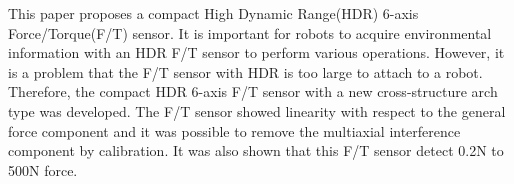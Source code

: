 This paper proposes a compact High Dynamic Range(HDR) 6-axis Force/Torque(F/T) sensor.
It is important for robots to acquire environmental information with an HDR F/T sensor to perform various operations.
However, it is a problem that the F/T sensor with HDR is too large to attach to a robot.
Therefore, the compact HDR 6-axis F/T sensor with a new cross-structure arch type was developed.
The F/T sensor showed linearity with respect to the general force component and it was possible to remove the multiaxial interference component by calibration.
It was also shown that this F/T sensor  detect 0.2N to 500N force.


